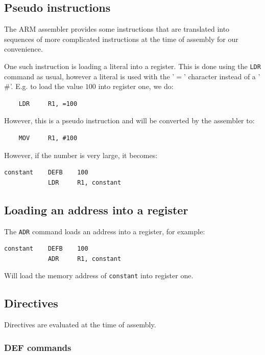 \documentclass{article}
\begin{document}
\subsection{Pseudo instructions}

The ARM assembler provides some instructions that are translated into sequences of more complicated instructions at the time of assembly for our convenience.

One such instruction is loading a literal into a register. This is done using the {\tt LDR} command as usual, however a literal is used with the '$=$' character instead of a '$\#$'. E.g. to load the value $100$ into register one, we do:

\begin{verbatim}
	LDR 	R1, =100
\end{verbatim}

However, this is a pseudo instruction and will be converted by the assembler to:

\begin{verbatim}
	MOV 	R1, #100
\end{verbatim}

However, if the number is very large, it becomes:

\begin{verbatim}
constant	DEFB 	100
			LDR 	R1, constant
\end{verbatim}

\subsection{Loading an address into a register}

The {\tt ADR} command loads an address into a register, for example:

\begin{verbatim}
constant	DEFB 	100
			ADR 	R1, constant
\end{verbatim}

Will load the memory address of {\tt constant} into register one.

\subsection{Directives}
Directives are evaluated at the time of assembly.

\subsubsection{DEF commands}
\end{document}
